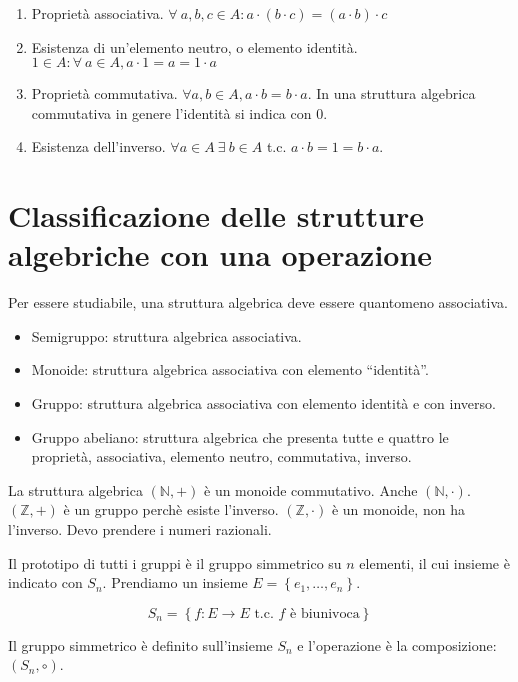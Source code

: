 \begin{enumerate}
    \item Propriet\`a associativa. $\forall \ a, b, c \in A : a \cdot (b \cdot c) = (a \cdot b) \cdot c$
    \item Esistenza di un'elemento neutro, o elemento identit\`a. $1 \in A : \forall \ a \in A , a \cdot 1 = a = 1 \cdot a$
    \item Propriet\`a commutativa. $ \forall a, b \in A , a \cdot b = b \cdot a $. In una struttura algebrica commutativa in genere l'identit\`a si indica con 0.
    \item Esistenza dell'inverso. $ \forall a \in A \ \exists \ b \in A $ t.c. $a \cdot b = 1 = b \cdot a $.
\end{enumerate}

\section{Classificazione delle strutture algebriche con una operazione}

Per essere studiabile, una struttura algebrica deve essere quantomeno associativa.

\begin{itemize}
    \item Semigruppo: struttura algebrica associativa.
    \item Monoide: struttura algebrica associativa con elemento ``identit\`a''.
    \item Gruppo: struttura algebrica associativa con elemento identit\`a e con inverso.
    \item Gruppo abeliano: struttura algebrica che presenta tutte e quattro le propriet\`a, associativa, elemento neutro, commutativa, inverso.
\end{itemize}

La struttura algebrica $\left( \mathbb{N}, + \right)$ \`e un monoide commutativo. Anche $\left( \mathbb{N}, \cdot \right)$. $\left( \mathbb{Z}, + \right)$ \`e un gruppo perch\`e esiste l'inverso. $\left( \mathbb{Z}, \cdot \right)$ \`e un monoide, non ha l'inverso. Devo prendere i numeri razionali.

Il prototipo di tutti i gruppi \`e il gruppo simmetrico su $n$ elementi, il cui insieme \`e indicato con $S_n$. Prendiamo un insieme $E = \left\{ e_1, \dots, e_n \right\}$.

\[
S_n = \left\{ f : E \to E \text{ t.c. $f$ \`e biunivoca} \right\}
\]

Il gruppo simmetrico \`e definito sull'insieme $S_n$ e l'operazione \`e la composizione: $\left( S_n, \circ \right)$.

